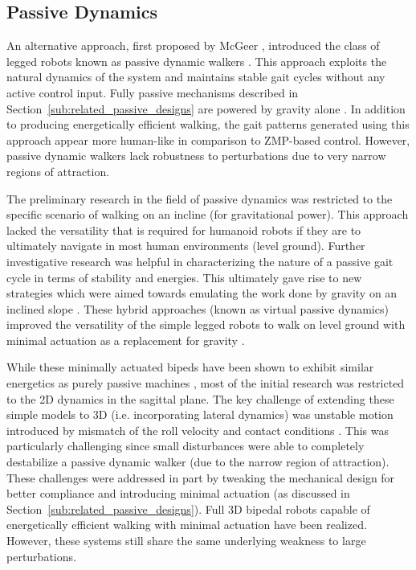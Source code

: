 \subsection{Passive Dynamics} %
\label{sub:related_passive_dynamics}
An alternative approach, first proposed by McGeer \cite{McGeer:1990uk}, introduced the class of legged robots known as passive dynamic walkers \cite{Collins:2005vp}. This approach exploits the natural dynamics of the system and maintains stable gait cycles without any active control input. Fully passive mechanisms described in Section~\ref{sub:related_passive_designs} are powered by gravity alone \cite{Spong:1999vk}. In addition to producing energetically efficient walking, the gait patterns generated using this approach appear more human-like in comparison to ZMP-based control. However, passive dynamic walkers lack robustness to perturbations due to very narrow regions of attraction.

The preliminary research in the field of passive dynamics was restricted to the specific scenario of walking on an incline (for gravitational power). This approach lacked the versatility that is required for humanoid robots if they are to ultimately navigate in most human environments (level ground). Further investigative research was helpful in characterizing the nature of a passive gait cycle \cite{Goswami:1996gn} in terms of stability and energies. This ultimately gave rise to new strategies which were aimed towards emulating the work done by gravity on an inclined slope \cite{Asano:2000wi}. These hybrid approaches (known as virtual passive dynamics) improved the versatility of the simple legged robots to walk on level ground with minimal actuation as a replacement for gravity \cite{Asano:2004tv}. 

While these minimally actuated bipeds have been shown to exhibit similar energetics as purely passive machines \cite{Asano:2004jp}, most of the initial research was restricted to the 2D dynamics in the sagittal plane. The key challenge of extending these simple models to 3D (i.e. incorporating lateral dynamics) was unstable motion introduced by mismatch of the roll velocity and contact conditions \cite{Kuo:1999tn}. This was particularly challenging since small disturbances were able to completely destabilize a passive dynamic walker (due to the narrow region of attraction). These challenges were addressed in part by tweaking the mechanical design for better compliance and introducing minimal actuation (as discussed in Section~\ref{sub:related_passive_designs}). Full 3D bipedal robots capable of energetically efficient walking with minimal actuation have been realized. However, these systems still share the same underlying weakness to large perturbations. 


